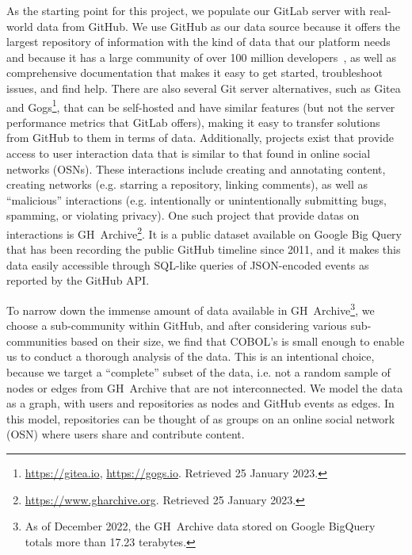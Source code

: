 \documentclass[dvipsnames,format=sigconf,anonymous=False,review=false, balance=false]{acmart}
\begin{document}
As the starting point for this project, we populate our GitLab server with real-world data from GitHub. We use GitHub as our data source because it offers the largest repository of information with the kind of data that our platform needs and because it has a large community of over 100 million developers~\cite{dohmke2023million}, as well as comprehensive documentation that makes it easy to get started, troubleshoot issues, and find help. There are also several Git server alternatives, such as Gitea and Gogs\footnote{\url{https://gitea.io}, \url{https://gogs.io}. Retrieved 25 January 2023.}, that can be self-hosted and have similar features (but not the server performance metrics that GitLab offers), making it easy to transfer solutions from GitHub to them in terms of data. Additionally, projects exist that provide access to user interaction data that is similar to that found in online social networks (OSNs). These interactions include creating and annotating content, creating networks (e.g. starring a repository, linking comments), as well as ``malicious'' interactions (e.g. intentionally or unintentionally submitting bugs, spamming, or violating privacy). One such project that provide datas on interactions is GH~Archive\footnote{\url{https://www.gharchive.org}.  Retrieved 25 January 2023.}. It is a public dataset available on Google Big Query that has been recording the public GitHub timeline since 2011, and it makes this data easily accessible through SQL-like queries of JSON-encoded events as reported by the GitHub API.

To narrow down the immense amount of data available in GH~Archive\footnote{As of December 2022, the GH~Archive data stored on Google BigQuery totals more than 17.23 terabytes.}, we choose a sub-community within GitHub, and after considering various sub-communities based on their size, we find that COBOL's is small enough to enable us to conduct a thorough analysis of the data. This is an intentional choice, because we target a ``complete'' subset of the data, i.e. not a random sample of nodes or edges from GH~Archive that are not interconnected. We model the data as a graph, with users and repositories as nodes and GitHub events as edges. In this model, repositories can be thought of as groups on an online social network (OSN) where users share and contribute content. 
\end{document}
